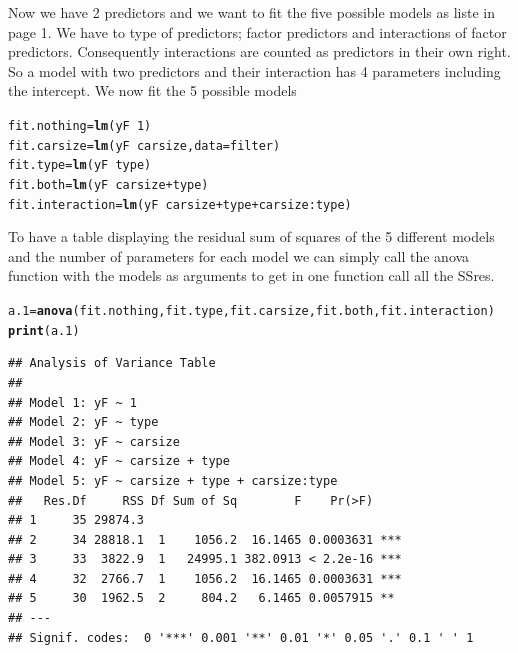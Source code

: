 \documentclass{article}\usepackage[]{graphicx}\usepackage[]{color}
\makeatletter
\newcommand{\hlnum}[1]{\textcolor[rgb]{0.686,0.059,0.569}{#1}}%
\newcommand{\hlopt}[1]{\textcolor[rgb]{0,0,0}{#1}}%
\newcommand{\hlstd}[1]{\textcolor[rgb]{0.345,0.345,0.345}{#1}}%
\newcommand{\hlkwb}[1]{\textcolor[rgb]{0.69,0.353,0.396}{#1}}%
\newcommand{\hlkwc}[1]{\textcolor[rgb]{0.333,0.667,0.333}{#1}}%
\newcommand{\hlkwd}[1]{\textcolor[rgb]{0.737,0.353,0.396}{\textbf{#1}}}%
\newenvironment{kframe}{%
 \def\at@end@of@kframe{}%
 \ifinner\ifhmode%
  \def\at@end@of@kframe{\end{minipage}}%
  \begin{minipage}{\columnwidth}%
 \fi\fi%
 \def\FrameCommand##1{\hskip\@totalleftmargin \hskip-\fboxsep
 \colorbox{shadecolor}{##1}\hskip-\fboxsep
     \hskip-\linewidth \hskip-\@totalleftmargin \hskip\columnwidth}%
 \MakeFramed {\advance\hsize-\width
   \@totalleftmargin\z@ \linewidth\hsize
   \@setminipage}}%
 {\par\unskip\endMakeFramed%
 \at@end@of@kframe}
\newenvironment{knitrout}{}{} %
\makeatother
\begin{document}
Now we have 2 predictors and we want to fit the five possible models as liste in page 1. We have to type of predictors; factor predictors and interactions of factor predictors. Consequently interactions are counted as predictors in their own right. So a model with two predictors and their interaction has 4 parameters including the intercept. We now fit the 5 possible models 

\begin{knitrout}
\color{fgcolor}\begin{kframe}
\begin{alltt}
\hlstd{fit.nothing} \hlkwb{=} \hlkwd{lm}\hlstd{(yF} \hlopt{~} \hlnum{1}\hlstd{)}
\hlstd{fit.carsize} \hlkwb{=} \hlkwd{lm}\hlstd{(yF} \hlopt{~} \hlstd{carsize,} \hlkwc{data} \hlstd{= filter)}
\hlstd{fit.type} \hlkwb{=} \hlkwd{lm}\hlstd{(yF} \hlopt{~} \hlstd{type)}
\hlstd{fit.both} \hlkwb{=} \hlkwd{lm}\hlstd{(yF} \hlopt{~} \hlstd{carsize} \hlopt{+} \hlstd{type)}
\hlstd{fit.interaction} \hlkwb{=} \hlkwd{lm}\hlstd{(yF} \hlopt{~} \hlstd{carsize} \hlopt{+} \hlstd{type} \hlopt{+}\hlstd{carsize}\hlopt{:}\hlstd{type)}
\end{alltt}
\end{kframe}
\end{knitrout}
To have a table displaying the residual sum of squares of the 5 different models and the number of parameters for each model we can simply call the anova function with the models as arguments to get in one function call all the SSres.
\clearpage
\begin{knitrout}
\color{fgcolor}\begin{kframe}
\begin{alltt}
\hlstd{a.1} \hlkwb{=} \hlkwd{anova}\hlstd{(fit.nothing,fit.type, fit.carsize, fit.both, fit.interaction)}
\hlkwd{print}\hlstd{(a.1)}
\end{alltt}
\begin{verbatim}
## Analysis of Variance Table
## 
## Model 1: yF ~ 1
## Model 2: yF ~ type
## Model 3: yF ~ carsize
## Model 4: yF ~ carsize + type
## Model 5: yF ~ carsize + type + carsize:type
##   Res.Df     RSS Df Sum of Sq        F    Pr(>F)    
## 1     35 29874.3                                    
## 2     34 28818.1  1    1056.2  16.1465 0.0003631 ***
## 3     33  3822.9  1   24995.1 382.0913 < 2.2e-16 ***
## 4     32  2766.7  1    1056.2  16.1465 0.0003631 ***
## 5     30  1962.5  2     804.2   6.1465 0.0057915 ** 
## ---
## Signif. codes:  0 '***' 0.001 '**' 0.01 '*' 0.05 '.' 0.1 ' ' 1
\end{verbatim}
\end{kframe}
\end{knitrout}
\end{document}
